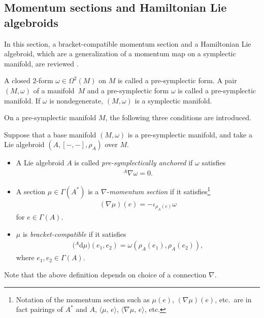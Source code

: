 \documentclass[pdftex]{sigma}
\numberwithin{equation}{section}
\newcommand{\rhoa}{{\rho_A}}
\newcommand{\bracket}[2]{\langle #1,\,#2\rangle}
\newcommand{\rd}{\mathrm{d}}
\newcommand{\anabla}{{{}^A \nabla}}
\begin{document}
\subsection{Momentum sections and Hamiltonian Lie algebroids}\label{MSHLA}
In this section, a bracket-compatible momentum section and a Hamiltonian Lie
algebroid, which are a generalization of a momentum map on a symplectic
manifold, are reviewed \cite{Blohmann:2023,Blohmann:2018}.

A closed $2$-form $\omega \in \Omega^2(M)$ on $M$ is called a pre-symplectic form. A pair $(M, \omega)$ of a manifold~$M$ and a pre-symplectic form $\omega$ is called a pre-symplectic manifold. If $\omega$ is nondegenerate, $(M, \omega)$ is a symplectic manifold.

On a pre-symplectic manifold $M$, the following three conditions are introduced.

\begin{Definition}\label{momsymp}
Suppose that a base manifold $(M, \omega)$ is a pre-symplectic manifold, and
take a Lie algebroid $(A, [-,-], \rhoa)$ over $M$.
\begin{itemize}\itemsep=0pt
\item[(S1)] A Lie algebroid $A$ is called \textit{pre-symplectically anchored} if $\omega$ satisfies
\begin{gather}
\anabla \omega =0.\label{HH1}
\end{gather}
\item[(S2)] A section $\mu \in \Gamma(A^*)$ is a $\nabla$-\textit{momentum section} if it satisfies\footnote{Notation of the momentum section such as $\mu(e)$, $(\nabla \mu)(e)$, etc.~are in fact pairings of $A^*$ and $A$, $\bracket{\mu}{e}$, $\bracket{\nabla \mu}{e}$, etc.}
\begin{gather}
(\nabla \mu)(e) = - \iota_{\rhoa(e)} \omega\label{HH2}
\end{gather}
for $e \in \Gamma(A)$.
\item[(S3)] $\mu$ is \textit{bracket-compatible} if it satisfies
\begin{gather}
\bigl({}^A \rd \mu\bigr)(e_1, e_2) = \omega(\rhoa(e_1), \rhoa(e_2)),
\label{HH3}
\end{gather}
where $e_1, e_2 \in \Gamma(A)$.
\end{itemize}
\end{Definition}
Note that the above definition depends on choice of a connection $\nabla$.
\end{document}
